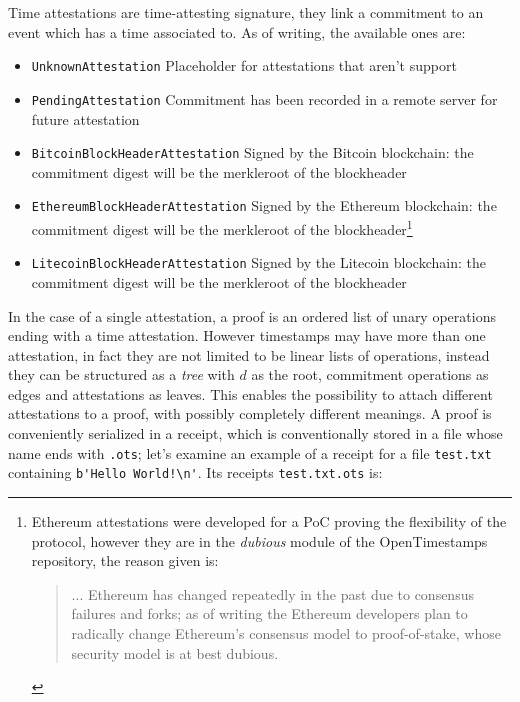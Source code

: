Time attestations are time-attesting signature, they link a commitment to an event which has a time associated to. As of writing, the available ones are:
\begin{itemize}
	\item \verb|UnknownAttestation| Placeholder for attestations that aren't support
	\item \verb|PendingAttestation| Commitment has been recorded in a remote server for future attestation
	\item \verb|BitcoinBlockHeaderAttestation| Signed by the Bitcoin blockchain: the commitment digest will be the merkleroot of the blockheader
	\item \verb|EthereumBlockHeaderAttestation| Signed by the Ethereum blockchain: the commitment digest will be the merkleroot of the blockheader\footnote{Ethereum attestations were developed for a PoC proving the flexibility of the protocol, however they are in the \textit{dubious} module of the OpenTimestamps repository, the reason given is:
		\begin{quotation}
			... Ethereum has changed repeatedly in the past due to consensus failures and forks; as of writing the Ethereum developers plan to radically change Ethereum's consensus model to proof-of-stake, whose security model is at best dubious.
	\end{quotation}}
	\item 
	\verb|LitecoinBlockHeaderAttestation| Signed by the Litecoin blockchain: the commitment digest will be the merkleroot of the blockheader
\end{itemize}
In the case of a single attestation, a proof is an ordered list of unary operations ending with a time attestation.  
However timestamps may have more than one attestation, in fact they are not limited to be linear lists of operations, instead they can be structured as a \textit{tree} with $d$ as the root, commitment operations as edges and attestations as leaves.
This enables the possibility to attach different attestations to a proof, with possibly completely different meanings.
A proof is conveniently serialized in a receipt, which is conventionally stored in a file whose name ends with \verb|.ots|;
let's examine an example of a receipt for a file \verb|test.txt| containing \verb|b'Hello World!\n'|. 
Its receipts \verb|test.txt.ots| is:
